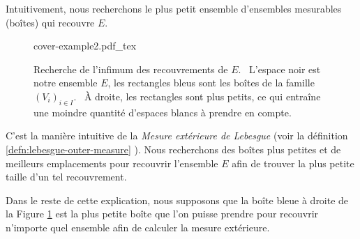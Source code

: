\documentclass[a4paper]{article}
\newcommand{\incfig}[1]{%
    \def\svgwidth{\columnwidth}
    {#1.pdf_tex}
}
\begin{document}
Intuitivement, nous recherchons le plus petit ensemble d'ensembles mesurables (boîtes) qui recouvre
$E$.

\begin{figure}[H]
    
    \centering
    \incfig{cover-example2}
    \caption{Recherche de l'infimum des recouvrements de $E$. \
        L'espace noir est notre ensemble $E$, les rectangles bleus sont les boîtes de la famille $(V_i)_{i \in I}$. \
        À droite, les rectangles sont plus petits, ce qui entraîne une moindre quantité d'espaces blancs à prendre en compte.}
    \label{fig:cover-example2}
\end{figure}%


C'est la manière intuitive de la %
\textit{Mesure extérieure de Lebesgue}%
 (voir la
définition ~%
\ref{defn:lebesgue-outer-measure}%
). Nous recherchons des boîtes plus petites et de meilleurs emplacements pour recouvrir l'ensemble $E$ afin de trouver la plus petite taille d'un tel recouvrement.

Dans le reste de cette explication, nous supposons que la boîte bleue à droite de la Figure %
\ref{fig:cover-example2}%
 est la plus petite boîte que l'on puisse prendre pour recouvrir n'importe quel ensemble afin de calculer la mesure extérieure.
\end{document}
